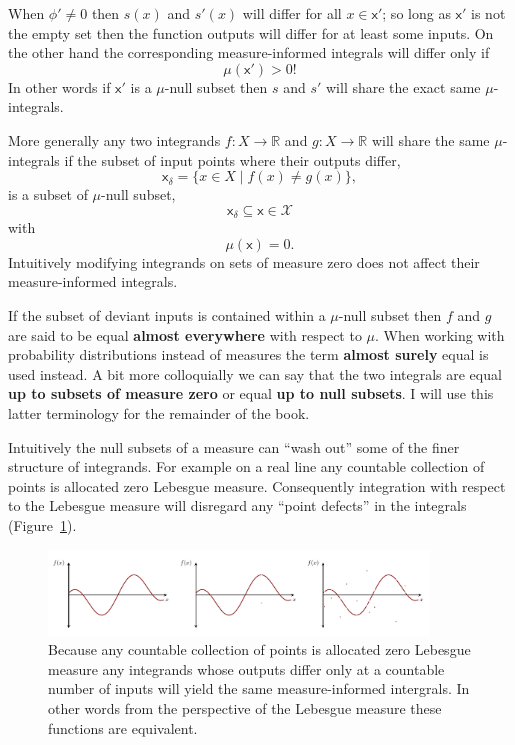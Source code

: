 \documentclass[
  letterpaper,
  DIV=11,
  numbers=noendperiod]{scrartcl}
\begin{document}
When \(\phi' \ne 0\) then \(s(x)\) and \(s'(x)\) will differ for all
\(x \in \mathsf{x}'\); so long as \(\mathsf{x}'\) is not the empty set
then the function outputs will differ for at least some inputs. On the
other hand the corresponding measure-informed integrals will differ only
if \[
\mu(\mathsf{x}') > 0!
\] In other words if \(\mathsf{x}'\) is a \(\mu\)-null subset then \(s\)
and \(s'\) will share the exact same \(\mu\)-integrals.

More generally any two integrands \(f: X \rightarrow \mathbb{R}\) and
\(g: X \rightarrow \mathbb{R}\) will share the same \(\mu\)-integrals if
the subset of input points where their outputs differ, \[
\mathsf{x}_{\delta} = \{ x \in X \mid f(x) \ne g(x) \},
\] is a subset of \(\mu\)-null subset, \[
\mathsf{x}_{\delta} \subseteq \mathsf{x} \in \mathcal{X}
\] with \[
\mu(\mathsf{x}) = 0.
\] Intuitively modifying integrands on sets of measure zero does not
affect their measure-informed integrals.

If the subset of deviant inputs is contained within a \(\mu\)-null
subset then \(f\) and \(g\) are said to be equal \textbf{almost
everywhere} with respect to \(\mu\). When working with probability
distributions instead of measures the term \textbf{almost surely} equal
is used instead. A bit more colloquially we can say that the two
integrals are equal \textbf{up to subsets of measure zero} or equal
\textbf{up to null subsets}. I will use this latter terminology for the
remainder of the book.

Intuitively the null subsets of a measure can ``wash out'' some of the
finer structure of integrands. For example on a real line any countable
collection of points is allocated zero Lebesgue measure. Consequently
integration with respect to the Lebesgue measure will disregard any
``point defects'' in the integrals
(Figure~\ref{fig-equivalent-integrands}).

\begin{figure}

{\centering \includegraphics[width=0.9\textwidth,height=\textheight]{figures/equivalent_integrands/equivalent_integrands.pdf}

}

\caption{\label{fig-equivalent-integrands}Because any countable
collection of points is allocated zero Lebesgue measure any integrands
whose outputs differ only at a countable number of inputs will yield the
same measure-informed intergrals. In other words from the perspective of
the Lebesgue measure these functions are equivalent.}

\end{figure}
\end{document}
